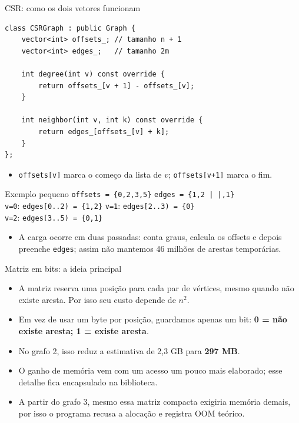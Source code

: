 \documentclass[10pt]{beamer}
\begin{document}
\begin{frame}[fragile]{CSR: como os dois vetores funcionam}
\begin{lstlisting}
class CSRGraph : public Graph {
    vector<int> offsets_; // tamanho n + 1
    vector<int> edges_;   // tamanho 2m

    int degree(int v) const override {
        return offsets_[v + 1] - offsets_[v];
    }

    int neighbor(int v, int k) const override {
        return edges_[offsets_[v] + k];
    }
};
\end{lstlisting}
\begin{itemize}
\item \texttt{offsets[v]} marca o come\c co da lista de $v$;
\texttt{offsets[v+1]} marca o fim.
\end{itemize}
\begin{block}{Exemplo pequeno}
\small
\texttt{offsets = \{0,2,3,5\}} \quad
\texttt{edges = \{1,2 \;| \;|,1\}}\\
\texttt{v=0}: \texttt{edges[0..2) = \{1,2\}}\qquad
\texttt{v=1}: \texttt{edges[2..3) = \{0\}}\\
\texttt{v=2}: \texttt{edges[3..5) = \{0,1\}}
\end{block}
\begin{itemize}
\item A carga ocorre em duas passadas: conta graus, calcula os offsets e
depois preenche \texttt{edges}; assim n\~ao mantemos 46 milh\~oes de arestas
tempor\'arias.
\end{itemize}
\end{frame}

\begin{frame}{Matriz em bits: a ideia principal}
\begin{itemize}
\item A matriz reserva uma posi\c c\~ao para cada par de v\'ertices, mesmo
quando n\~ao existe aresta. Por isso seu custo depende de $n^2$.
\item Em vez de usar um byte por posi\c c\~ao, guardamos apenas um bit:
\textbf{0 = n\~ao existe aresta; 1 = existe aresta}.
\item No grafo 2, isso reduz a estimativa de 2,3 GB para \textbf{297 MB}.
\item O ganho de mem\'oria vem com um acesso um pouco mais elaborado; esse
detalhe fica encapsulado na biblioteca.
\item A partir do grafo 3, mesmo essa matriz compacta exigiria mem\'oria demais,
por isso o programa recusa a aloca\c c\~ao e registra OOM te\'orico.
\end{itemize}
\end{frame}
\end{document}
